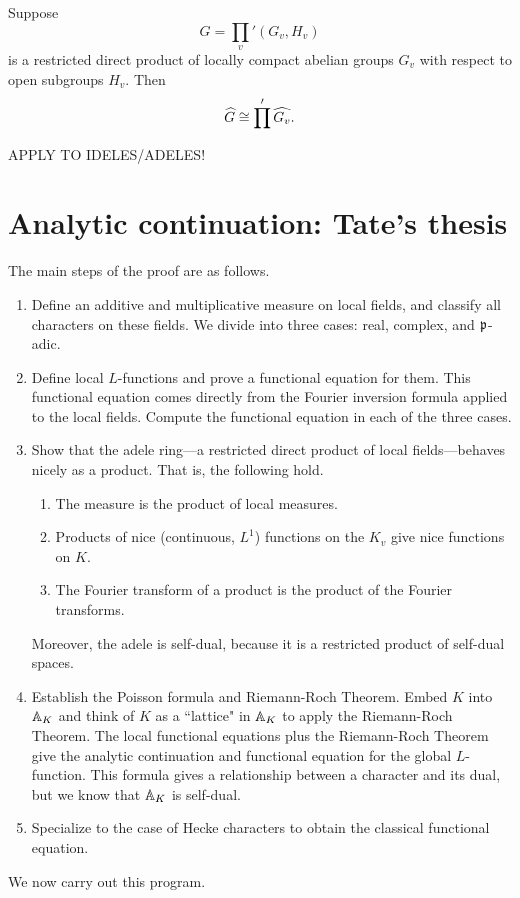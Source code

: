 \begin{thm}
Suppose
\[
G=\prod_v'(G_v,H_v)
\]
is a restricted direct product of locally compact abelian groups $G_v$ with respect to open subgroups $H_v$. Then
\[
\widehat{G}\cong \prod' \widehat{G_v}.
\]
\end{thm}
APPLY TO IDELES/ADELES!
\section{Analytic continuation: Tate's thesis}
The main steps of the proof are as follows.
\begin{enumerate}
\item Define an additive and multiplicative measure on local fields, and classify all characters on these fields. We divide into three cases: real, complex, and $\mathfrak{p}$-adic.
\item
Define local $L$-functions and prove a functional equation for them. This functional equation comes directly from the Fourier inversion formula applied to the local fields. Compute the functional equation in each of the three cases. 
\item
Show that the adele ring---a restricted direct product of local fields---behaves nicely as a product. That is, the following hold.
\begin{enumerate}
\item
The measure is the product of local measures.
\item
Products of nice (continuous, $L^1$) functions on the $K_v$ give nice functions on $K$.
\item
The Fourier transform of a product is the product of the Fourier transforms.
\end{enumerate}
Moreover, the adele is self-dual, because it is a restricted product of self-dual spaces.
\item
Establish the Poisson formula and Riemann-Roch Theorem. Embed $K$ into $\mathbb{A}_K$ and think of $K$ as a ``lattice" in $\mathbb{A}_K$ to apply the Riemann-Roch Theorem. The local functional equations plus the Riemann-Roch Theorem give the analytic continuation and functional equation for the global $L$-function. This formula gives a relationship between a character and its dual, but we know that $\mathbb{A}_K$ is self-dual.
\item
Specialize to the case of Hecke characters to obtain the classical functional equation.
\end{enumerate}
We now carry out this program.
